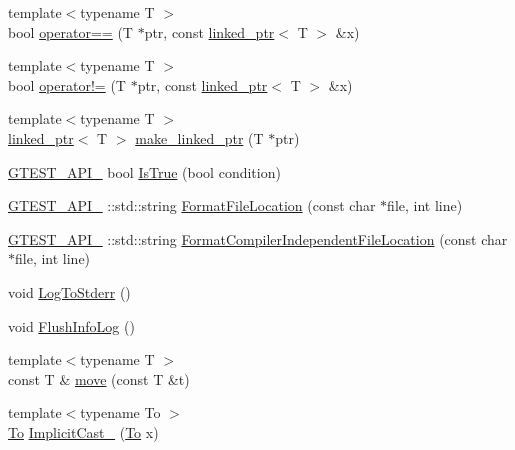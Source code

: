 \begin{DoxyCompactItemize}
\item 
{\footnotesize template$<$typename T $>$ }\\bool \hyperlink{namespacetesting_1_1internal_ad1cb54a206a209ddace17a05359d38ae}{operator==} (T $\ast$ptr, const \hyperlink{classtesting_1_1internal_1_1linked__ptr}{linked\+\_\+ptr}$<$ T $>$ \&x)
\item 
{\footnotesize template$<$typename T $>$ }\\bool \hyperlink{namespacetesting_1_1internal_a6910869259f8f31825b471e9190fa09a}{operator!=} (T $\ast$ptr, const \hyperlink{classtesting_1_1internal_1_1linked__ptr}{linked\+\_\+ptr}$<$ T $>$ \&x)
\item 
{\footnotesize template$<$typename T $>$ }\\\hyperlink{classtesting_1_1internal_1_1linked__ptr}{linked\+\_\+ptr}$<$ T $>$ \hyperlink{namespacetesting_1_1internal_a0d79fad1f772844eff35dfe955f24fd6}{make\+\_\+linked\+\_\+ptr} (T $\ast$ptr)
\item 
\hyperlink{gtest-port_8h_aa73be6f0ba4a7456180a94904ce17790}{G\+T\+E\+S\+T\+\_\+\+A\+P\+I\+\_\+} bool \hyperlink{namespacetesting_1_1internal_a527b9bcc13669b9a16400c8514266254}{Is\+True} (bool condition)
\item 
\hyperlink{gtest-port_8h_aa73be6f0ba4a7456180a94904ce17790}{G\+T\+E\+S\+T\+\_\+\+A\+P\+I\+\_\+} \+::std\+::string \hyperlink{namespacetesting_1_1internal_a31b7c3abed4a7c395f42c61e993989f4}{Format\+File\+Location} (const char $\ast$file, int line)
\item 
\hyperlink{gtest-port_8h_aa73be6f0ba4a7456180a94904ce17790}{G\+T\+E\+S\+T\+\_\+\+A\+P\+I\+\_\+} \+::std\+::string \hyperlink{namespacetesting_1_1internal_a1ee4cde97868c53e442d3182496a9f3c}{Format\+Compiler\+Independent\+File\+Location} (const char $\ast$file, int line)
\item 
void \hyperlink{namespacetesting_1_1internal_a06b1b20029fbd1dbeb59752f914fab84}{Log\+To\+Stderr} ()
\item 
void \hyperlink{namespacetesting_1_1internal_a2135f223bf6b527729aeaa651115183b}{Flush\+Info\+Log} ()
\item 
{\footnotesize template$<$typename T $>$ }\\const T \& \hyperlink{namespacetesting_1_1internal_a0f6d06bf8c3093b9c22bb08723db201e}{move} (const T \&t)
\item 
{\footnotesize template$<$typename To $>$ }\\\hyperlink{classtesting_1_1internal_1_1_to}{To} \hyperlink{namespacetesting_1_1internal_a982df3f369643b175f79cda4048bc3b9}{Implicit\+Cast\+\_\+} (\hyperlink{classtesting_1_1internal_1_1_to}{To} x)

\end{DoxyCompactItemize}
